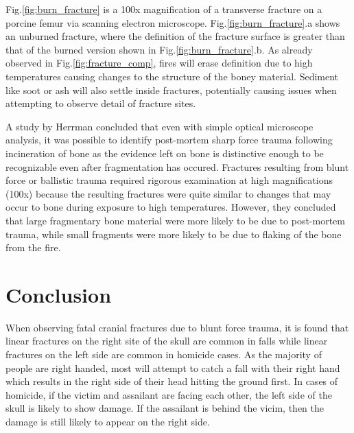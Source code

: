 \documentclass[titlepage]{article}
\begin{document}
Fig.\ref{fig:burn_fracture} is a 100x magnification of a transverse fracture on a porcine femur via scanning electron microscope. Fig.\ref{fig:burn_fracture}.a shows an unburned fracture, where the definition of the fracture surface is greater than that of the burned version shown in Fig.\ref{fig:burn_fracture}.b. As already observed in Fig.\ref{fig:fracture_comp}, fires will erase definition due to high temperatures causing changes to the structure of the boney material. Sediment like soot or ash will also settle inside fractures, potentially causing issues when attempting to observe detail of fracture sites.

A study by Herrman concluded that even with simple optical microscope analysis, it was possible to identify post-mortem sharp force trauma following incineration of bone as the evidence left on bone is distinctive enough to be recognizable even after fragmentation has occured. Fractures resulting from blunt force or ballistic trauma required rigorous examination at high magnifications (100x) because the resulting fractures were quite similar to changes that may occur to bone during exposure to high temperatures. However, they concluded that large fragmentary bone material were more likely to be due to post-mortem trauma, while small fragments were more likely to be due to flaking of the bone from the fire. \cite{fire-bone}

\newpage
\section{Conclusion}

When observing fatal cranial fractures due to blunt force trauma, it is found that linear fractures on the right site of the skull are common in falls while linear fractures on the left side are common in homicide cases. As the majority of people are right handed, most will attempt to catch a fall with their right hand which results in the right side of their head hitting the ground first. In cases of homicide, if the victim and assailant are facing each other, the left side of the skull is likely to show damage. If the assailant is behind the vicim, then the damage is still likely to appear on the right side.\cite{craniums}

\newpage

\end{document}
